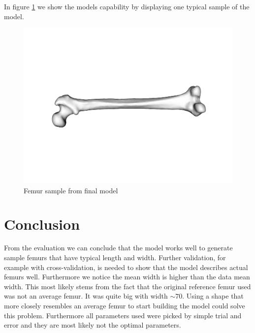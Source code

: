\documentclass[10pt]{article}
\theoremstyle{definition}
\begin{document}
In figure \ref{fig:randomsamplefemur} we show the models capability by displaying one typical sample of the model.
\begin{figure}[h!]
\centering
\includegraphics[scale=0.15]{screenshots/samplefemur.png}
\caption{Femur sample from final model}
\label{fig:randomsamplefemur}
\end{figure}

\newpage
\section{Conclusion}

From the evaluation we can conclude that the model works well to generate sample femurs that have typical length and width. Further validation, for example with cross-validation, is needed to show that the model describes actual femurs well. Furthermore we notice the mean width is higher than the data mean width. This most likely stems from the fact that the original reference femur used was not an average femur. It was quite big with width $\sim 70$. Using a shape that more closely resembles an average femur to start building the model could solve this problem. Furthermore all parameters used were picked by simple trial and error and they are most likely not the optimal parameters.
\end{document}
